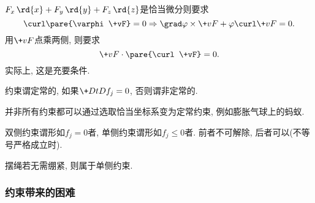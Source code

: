 \documentclass{ctexart}
\begin{document}
\begin{remark}[恰当微分的判定]
    \label{rm:恰当微分的判定}
    $F_x\,\rd{x} + F_y\,\rd{y} + F_z\,\rd{z}$是恰当微分则要求
    \[ \curl \pare{\varphi\+vF} = 0\Rightarrow \grad\varphi\times\+vF + \varphi\curl\+vF = 0. \]
    用$\+vF$点乘两侧, 则要求
    \[ \+vF\cdot\pare{\curl \+vF} = 0. \]
    实际上, 这是充要条件.
\end{remark}
\begin{definition}[定常约束]
    约束谓定常的, 如果$\+D{t}D{f_j} = 0$, 否则谓非定常的.
\end{definition}
\begin{ex}
    并非所有约束都可以通过选取恰当坐标系变为定常约束, 例如膨胀气球上的蚂蚁.
\end{ex}
\begin{definition}[双侧约束]
    双侧约束谓形如$f_j = 0$者, 单侧约束谓形如$f_j \le 0$者. 前者不可解除, 后者可以(不等号严格成立时).
\end{definition}
\begin{ex}
    摆绳若无需绷紧, 则属于单侧约束.
\end{ex}

\subsubsection{约束带来的困难} %
\label{ssub:约束带来的困难}
\end{document}
